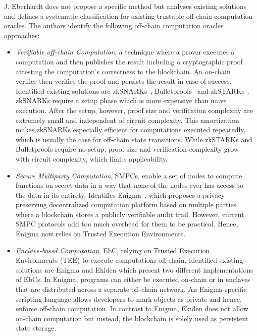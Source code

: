 \documentclass[final,3p,12pt,twocolumn]{elsarticle}
\begin{document}
J. Eberhardt \cite{Eberhardt2018} does not propose a specific method but analyses existing solutions and defines a systematic classification for existing trustable off-chain computation oracles. The authors identify the following off-chain computation oracles approaches:

\begin{itemize}
  \item \textit{Verifiable off-chain Computation}, a technique where a prover executes a computation and then publishes the result including a cryptographic proof attesting the computation’s correctness to the blockchain. An on-chain verifier then verifies the proof and persists the result in case of success. Identified existing solutions are zkSNARKs~\cite{Ben-SassonTechnionAlessandroChiesa2019}, Bulletproofs~\cite{Bunz2018} and zkSTARKs~\cite{Ben-Sasson2018}. zkSNARKs require a setup phase which is more expensive than naive execution. After the setup, however, proof size and verification complexity are extremely small and independent of circuit complexity. This amortization makes zkSNARKs especially efficient for computations executed repeatedly, which is usually the case for off-chain state transitions. While zkSTARKs and Bulletproofs require no setup, proof size and verification complexity grow with circuit complexity, which limits applicability.
  \item \textit{Secure Multiparty Computation}, SMPCs, enable a set of nodes to compute functions on secret data in a way that none of the nodes ever has access to the data in its entirety. Identifies Enigma~\cite{Tam2018}, which proposes a privacy-preserving decentralized computation platform based on multiple parties where a blockchain stores a publicly verifiable audit trail. However, current SMPC protocols add too much overhead for them to be practical. Hence, Enigma now relies on Trusted Execution Environments.
  \item \textit{Enclave-based Computation}, EbC, relying on Trusted Execution Environments (TEE) to execute computations off-chain. Identified existing solutions are Enigma and Ekiden \cite{Cheng2018} which present two different implementations of EbCs. In Enigma, programs can either be executed on-chain or in enclaves that are distributed across a separate off-chain network. An Enigma-specific scripting language allows developers to mark objects as private and hence, enforce off-chain computation. In contrast to Enigma, Ekiden does not allow on-chain computation but instead, the blockchain is solely used as persistent state storage.

\end{itemize}
\end{document}
